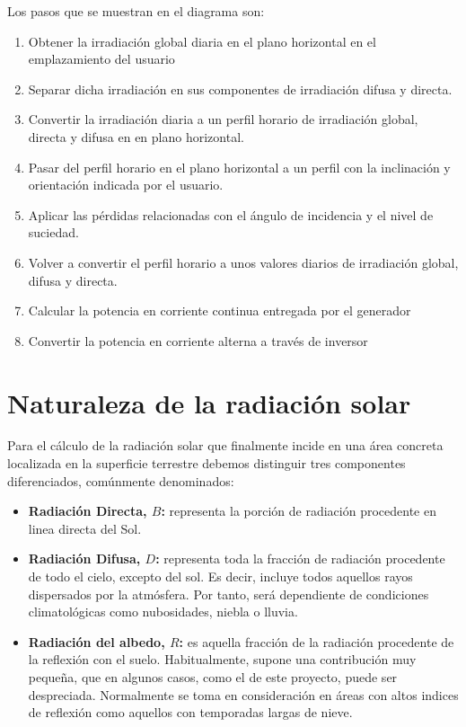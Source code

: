Los pasos que se muestran en el diagrama son:
\begin{enumerate}
	\item Obtener la irradiación global diaria en el plano horizontal en el emplazamiento del usuario
	\item Separar dicha irradiación  en sus componentes de irradiación difusa y directa.
	\item Convertir la irradiación diaria a un perfil horario de irradiación global, directa y difusa en en plano horizontal.
	\item Pasar del perfil horario en el plano horizontal a un perfil con la inclinación y orientación indicada por el usuario.
	\item Aplicar las pérdidas relacionadas con el ángulo de incidencia y el nivel de suciedad.
	\item Volver a convertir el perfil horario a unos valores diarios de irradiación global, difusa y directa.
	\item Calcular la potencia en corriente continua entregada por el generador
	\item Convertir la potencia en corriente alterna a través de inversor 
\end{enumerate}

\section{Naturaleza de la radiación solar}

Para el cálculo de la radiación solar que finalmente incide en una área concreta localizada en la superficie terrestre debemos distinguir tres componentes diferenciados, comúnmente denominados:

\begin{itemize}
\item \textbf{ Radiación Directa, $B$:} representa la porción de radiación procedente en linea directa del Sol.
\item \textbf{Radiación Difusa, $D$:} representa toda la fracción  de radiación procedente de todo el cielo, excepto del sol. Es decir, incluye todos aquellos rayos dispersados por la atmósfera. Por tanto, será dependiente de condiciones climatológicas como nubosidades, niebla o lluvia.
\item \textbf{Radiación del albedo, $R$:} es aquella fracción de la radiación procedente de la reflexión con el suelo. Habitualmente, supone una contribución muy pequeña, que en algunos casos, como el de este proyecto, puede ser despreciada. Normalmente se toma en consideración en áreas con altos indices de reflexión como aquellos con temporadas largas de nieve.
\end{itemize}

